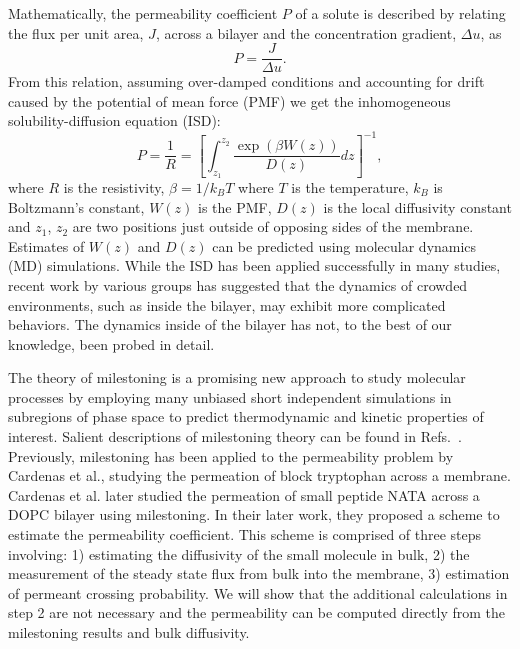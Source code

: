     \par Mathematically, the permeability coefficient $P$ of a solute is described by relating the flux per unit area, $J$, across a bilayer and the concentration gradient, $\Delta u$, as
    \begin{equation}
        P = \frac{J}{\Delta u}.
        \label{eq:ficks1st}
    \end{equation}
    From this relation, assuming over-damped conditions and accounting for drift caused by the potential of mean force (PMF) we get the inhomogeneous solubility-diffusion equation (ISD)\cite{Marrink1994,Woolf1994,Bemporad2004,Xiang2006,Awoonor-Williams2015}:
    \begin{equation}
        P = \frac{1}{R} = \left[\int_{z_1}^{z_2}\frac{\exp(\beta W(z))}{D(z)}dz\right]^{-1},
        \label{eq:ihsd}
    \end{equation}
    where $R$ is the resistivity, $\beta = 1/k_BT$ where $T$ is the temperature, $k_B$ is Boltzmann's constant, $W(z)$ is the PMF, $D(z)$ is the local diffusivity constant and $z_1$, $z_2$ are two positions just outside of opposing sides of the membrane. Estimates of $W(z)$ and $D(z)$ can be predicted using molecular dynamics (MD) simulations\cite{Xiang2006,Swift2013,Awoonor-Williams2015}.     While the ISD has been applied successfully in many studies\cite{Wilson1996,Grossfield2002,Ulander2003a,Bemporad2004,MacCallum2007,Johansson2008,MacCallum2008,Bauer2011,Tejwani2011,MacCallum2011,Paloncyova2012,Swift2013,Riahi2014,Carpenter2014,Issack2015,Bemporad2005,Comer2014a}, recent work by various groups has suggested that the dynamics of crowded environments, such as inside the bilayer, may exhibit more complicated behaviors\cite{McGuffee2010,Swift2013}. The dynamics inside of the bilayer has not, to the best of our knowledge, been probed in detail\cite{Swift2013}.


    \par The theory of milestoning is a promising new approach to study molecular processes by employing many unbiased short independent simulations in subregions of phase space to predict thermodynamic and kinetic properties of interest. Salient descriptions of milestoning theory can be found in Refs.~. Previously, milestoning has been applied to the permeability problem by Cardenas et al., studying the permeation of block tryptophan across a membrane\cite{Cardenas2012}. Cardenas et al. later studied the permeation of small peptide NATA across a DOPC bilayer using milestoning. In their later work, they proposed a scheme to estimate the permeability coefficient\cite{Cardenas2013,Cardenas2014}. This scheme is comprised of three steps involving: 1) estimating the diffusivity of the small molecule in bulk, 2) the measurement of the steady state flux from bulk into the membrane, 3) estimation of permeant crossing probability. We will show that the additional calculations in step 2 are not necessary and the permeability can be computed directly from the milestoning results and bulk diffusivity.

